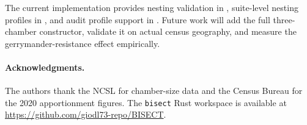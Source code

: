 The current implementation provides nesting validation in
, suite-level nesting profiles in
, and audit profile support in .
Future work will add the full three-chamber constructor, validate it on actual
census geography, and measure the gerrymander-resistance effect empirically.

\paragraph{Acknowledgments.}
The authors thank the NCSL for chamber-size data and the Census Bureau for the
2020 apportionment figures.  The \texttt{bisect} Rust workspace is available
at \url{https://github.com/giodl73-repo/BISECT}.
